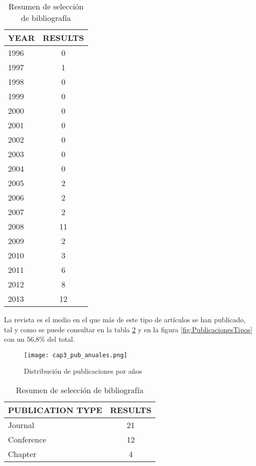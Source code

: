 \begin{table}[H]
  \begin{center}
  \begin{tabular}{| m{4cm} | c |}
    \hline
    YEAR & RESULTS\\
    \hline
    \hline 
    1996 & 0\\
    \hline
    1997 & 1\\
    \hline
    1998 & 0\\
    \hline
    1999 & 0\\
    \hline
    2000 & 0\\
    \hline
    2001 & 0\\
    \hline
    2002 & 0\\
    \hline
    2003 & 0\\
    \hline
    2004 & 0\\
    \hline
    2005 & 2\\
    \hline
    2006 & 2\\
    \hline
    2007 & 2\\
    \hline
    2008 & 11\\
    \hline
    2009 & 2\\
    \hline
    2010 & 3\\
    \hline
    2011 & 6\\
    \hline
    2012 & 8\\
    \hline
    2013 & 12 \\
    \hline
  \end{tabular}
\end{center}
\caption{Resumen de selección de bibliografía}
\label{tab:ResumenAniosResultados}
\end{table} 

La revista es el medio en el que más de este tipo de artículos se han publicado, tal y como se puede consultar en la tabla \ref{tab:ResumenForumResultados} y en la figura \ref{fig:PublicacionesTipos} con un 56,8\% del total.

\begin{figure}[H]
  \begin{center}
    \texttt{[image: cap3\_pub\_anuales.png]}
  \end{center}
  \caption{Distribución de publicaciones por años}
  \label{fig:PublicacionesAnuales}
\end{figure}

\begin{table}[H]
  \begin{center}
  \begin{tabular}{| m{4cm} | c |}
    \hline
    PUBLICATION TYPE & RESULTS\\
    \hline
    \hline 
    Journal & 21 \\
    \hline
    Conference & 12 \\
    \hline
    Chapter & 4 \\
    \hline
  \end{tabular}
\end{center}
\caption{Resumen de selección de bibliografía}
\label{tab:ResumenForumResultados}
\end{table} 

